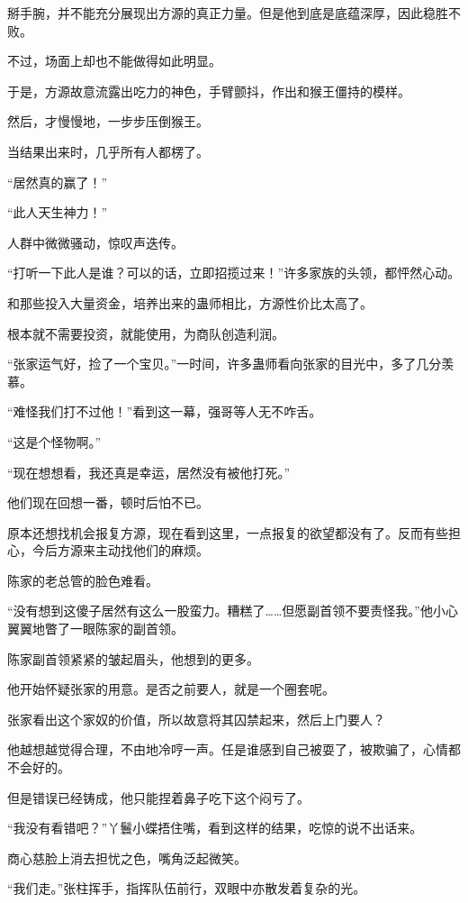 \begin{this_body}
掰手腕，并不能充分展现出方源的真正力量。但是他到底是底蕴深厚，因此稳胜不败。

不过，场面上却也不能做得如此明显。

于是，方源故意流露出吃力的神色，手臂颤抖，作出和猴王僵持的模样。

然后，才慢慢地，一步步压倒猴王。

当结果出来时，几乎所有人都楞了。

“居然真的赢了！”

“此人天生神力！”

人群中微微骚动，惊叹声迭传。

“打听一下此人是谁？可以的话，立即招揽过来！”许多家族的头领，都怦然心动。

和那些投入大量资金，培养出来的蛊师相比，方源性价比太高了。

根本就不需要投资，就能使用，为商队创造利润。

“张家运气好，捡了一个宝贝。”一时间，许多蛊师看向张家的目光中，多了几分羡慕。

“难怪我们打不过他！”看到这一幕，强哥等人无不咋舌。

“这是个怪物啊。”

“现在想想看，我还真是幸运，居然没有被他打死。”

他们现在回想一番，顿时后怕不已。

原本还想找机会报复方源，现在看到这里，一点报复的欲望都没有了。反而有些担心，今后方源来主动找他们的麻烦。

陈家的老总管的脸色难看。

“没有想到这傻子居然有这么一股蛮力。糟糕了……但愿副首领不要责怪我。”他小心翼翼地瞥了一眼陈家的副首领。

陈家副首领紧紧的皱起眉头，他想到的更多。

他开始怀疑张家的用意。是否之前要人，就是一个圈套呢。

张家看出这个家奴的价值，所以故意将其囚禁起来，然后上门要人？

他越想越觉得合理，不由地冷哼一声。任是谁感到自己被耍了，被欺骗了，心情都不会好的。

但是错误已经铸成，他只能捏着鼻子吃下这个闷亏了。

“我没有看错吧？”丫鬟小蝶捂住嘴，看到这样的结果，吃惊的说不出话来。

商心慈脸上消去担忧之色，嘴角泛起微笑。

“我们走。”张柱挥手，指挥队伍前行，双眼中亦散发着复杂的光。


\end{this_body}
